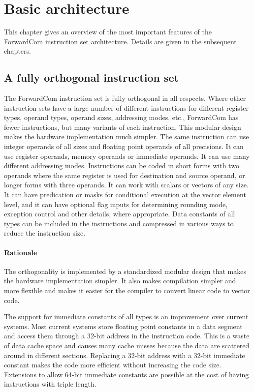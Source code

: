 \documentclass[forwardcom.tex]{subfiles}
\begin{document}
\RaggedRight

\chapter{Basic architecture}

This chapter gives an overview of the most important features of the ForwardCom instruction set architecture. Details are given in the subsequent chapters.

\section{A fully orthogonal instruction set}
The ForwardCom instruction set is fully orthogonal in all respects. 
Where other instruction sets have a large number of different instructions for different register types, operand types, operand sizes, addressing modes, etc., ForwardCom has fewer instructions, but many variants of each instruction. This modular design makes the hardware implementation much simpler.
The same instruction can use integer operands of all sizes and floating point operands of all precisions. It can use register operands, memory operands or immediate operands. It can use many different addressing modes. Instructions can be coded in short forms with two operands where the same register is used for destination and source operand, or longer forms with three operands. It can work with scalars or vectors of any size. It can have predication or masks for conditional execution at the vector element level, and it can have optional flag inputs for determining rounding mode, exception control and other details, where appropriate. Data constants of all types can be included in the instructions and compressed in various ways to reduce the instruction size.

\subsubsection{Rationale}
The orthogonality is implemented by a standardized modular design that makes the hardware implementation simpler. It also makes compilation simpler and more flexible and makes it easier for the compiler to convert linear code to vector code.
\vspace{2mm}

The support for immediate constants of all types is an improvement over current systems. Most current systems store floating point constants in a data segment and access them through a 32-bit address in the instruction code. This is a waste of data cache space and causes many cache misses because the data are scattered around in different sections. Replacing a 32-bit address with a 32-bit immediate constant makes the code more efficient without increasing the code size. Extensions to allow 64-bit immediate constants are possible at the cost of having instructions with triple length.
\end{document}
